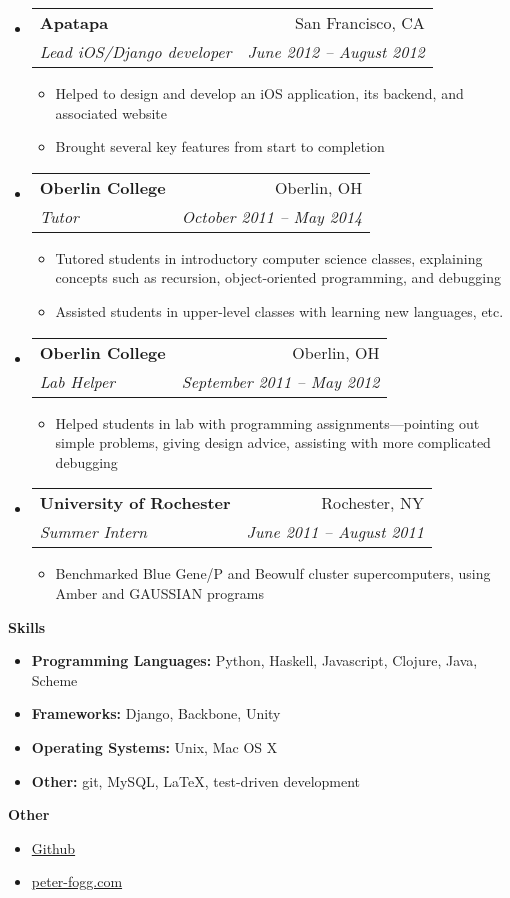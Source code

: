 \documentclass[letterpaper,11pt]{article}
\makeatletter
\newcommand{\resitem}[1]{\item #1 \vspace{-2pt}}
\newcommand{\resheading}[1]{{\large\colorbox{mygrey}{\begin{minipage}{\textwidth}{\textbf{#1\vphantom{p\^{E}}}}\end{minipage}}}}
\newcommand{\ressubheading}[4]{
  \begin{tabular*}{6.5in}{l@{\extracolsep{\fill}}r}
    \textbf{#1} & #2 \\
    \textit{#3} & \textit{#4} \\
  \end{tabular*}\vspace{-6pt}}
\makeatother
\begin{document}
\begin{itemize}
\begin{itemize}
  \end{itemize}
\item
  \ressubheading{Apatapa}{San Francisco, CA}{Lead iOS/Django developer}{June 2012 -- August 2012}
  \begin{itemize}
    \resitem{Helped to design and develop an iOS application, its backend, and associated website}
    \resitem{Brought several key features from start to completion}
  \end{itemize}
\item
  \ressubheading{Oberlin College}{Oberlin, OH}{Tutor}{October 2011 -- May 2014}
  \begin{itemize}
    \resitem{Tutored students in introductory computer science classes, explaining concepts such as recursion, object-oriented programming, and debugging}
    \resitem{Assisted students in upper-level classes with learning new languages, etc.}
  \end{itemize}
\item
  \ressubheading{Oberlin College}{Oberlin, OH}{Lab Helper}{September 2011 -- May 2012}
  \begin{itemize}
    \resitem{Helped students in lab with programming assignments---pointing out simple problems, giving design advice, assisting with more complicated debugging}
  \end{itemize}
\item
  \ressubheading{University of Rochester}{Rochester, NY}{Summer Intern}{June 2011 -- August 2011}
  \begin{itemize}
    \resitem{Benchmarked Blue Gene/P and Beowulf cluster supercomputers, using Amber and GAUSSIAN programs}
  \end{itemize}
\end{itemize}

\resheading{Skills}
\begin{itemize}
\item
  \textbf{Programming Languages:} Python, Haskell, Javascript, Clojure, Java, Scheme
\item
  \textbf{Frameworks:} Django, Backbone, Unity
\item
  \textbf{Operating Systems:} Unix, Mac OS X
\item
  \textbf{Other:} git, MySQL,  \LaTeX, test-driven development
\end{itemize}

\resheading{Other}
\begin{itemize}
\item \href{https://github.com/peter-fogg}{Github}
\item \href{http://peter-fogg.com}{peter-fogg.com}
\end{itemize}
\end{document}
